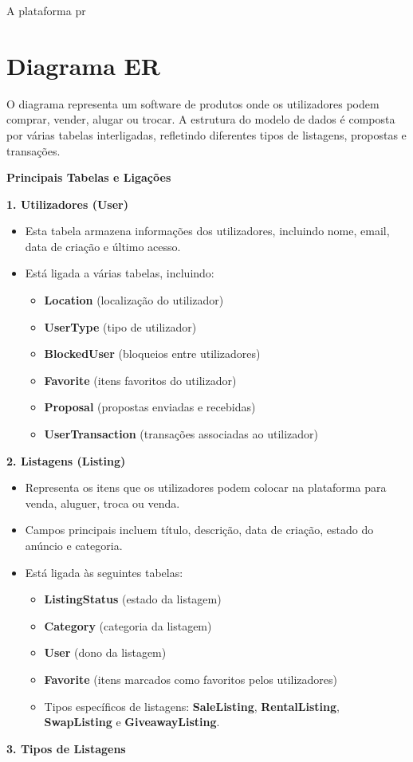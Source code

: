 \documentclass[a4paper, 12pt]{article} %
\begin{document}
A plataforma pr


\newpage
\section*{Diagrama ER}

O diagrama representa um software de produtos onde os utilizadores podem comprar, vender, alugar ou trocar. A estrutura do modelo de dados é composta por várias tabelas interligadas, refletindo diferentes tipos de listagens, propostas e transações.

\textbf{Principais Tabelas e Ligações}

\textbf{1. Utilizadores (User)}

\begin{itemize}
    \item Esta tabela armazena informações dos utilizadores, incluindo nome, email, data de criação e último acesso.
    \item Está ligada a várias tabelas, incluindo:
    \begin{itemize}
        \item \textbf{Location} (localização do utilizador)
        \item \textbf{UserType} (tipo de utilizador)
        \item \textbf{BlockedUser} (bloqueios entre utilizadores)
        \item \textbf{Favorite} (itens favoritos do utilizador)
        \item \textbf{Proposal} (propostas enviadas e recebidas)
        \item \textbf{UserTransaction} (transações associadas ao utilizador)
    \end{itemize}
\end{itemize}
\textbf{2. Listagens (Listing)}

\begin{itemize}
    \item Representa os itens que os utilizadores podem colocar na plataforma para venda, aluguer, troca ou venda.
    \item Campos principais incluem título, descrição, data de criação, estado do anúncio e categoria.
    \item Está ligada às seguintes tabelas:
    \begin{itemize}
        \item \textbf{ListingStatus} (estado da listagem)
        \item \textbf{Category} (categoria da listagem)
        \item \textbf{User} (dono da listagem)
        \item \textbf{Favorite} (itens marcados como favoritos pelos utilizadores)
        \item Tipos específicos de listagens: \textbf{SaleListing}, \textbf{RentalListing}, \textbf{SwapListing} e \textbf{GiveawayListing}.
    \end{itemize}
\end{itemize}
\textbf{3. Tipos de Listagens}
\end{document}
